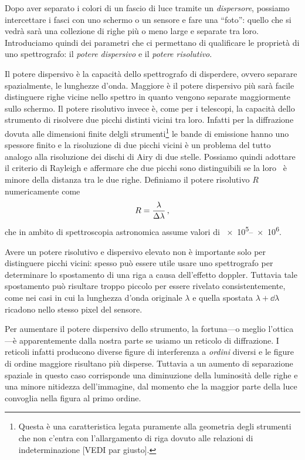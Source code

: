     Dopo aver separato i colori di un fascio di luce tramite un \emph{dispersore}, possiamo intercettare i fasci con uno schermo o un sensore e fare una ``foto'': quello che si vedrà sarà una collezione di righe più o meno large e separate tra loro. Introduciamo quindi dei parametri che ci permettano di qualificare le proprietà di uno spettrografo: il \emph{potere dispersivo} e il \emph{potere risolutivo}.
    
    Il potere dispersivo è la capacità dello spettrografo di disperdere, ovvero separare spazialmente, le lunghezze d'onda. Maggiore è il potere dispersivo più sarà facile distinguere righe vicine nello spettro in quanto vengono separate maggiormente sullo schermo. Il potere risolutivo invece è, come per i telescopi, la capacità dello strumento di risolvere due picchi distinti vicini tra loro. Infatti per la diffrazione dovuta alle dimensioni finite delgli strumenti\footnote{Questa è una caratteristica legata puramente alla geometria degli strumenti che non c'entra con l'allargamento di riga dovuto alle relazioni di indeterminazione [VEDI par giusto].} le bande di emissione hanno uno spessore finito e la risoluzione di due picchi vicini è un problema del tutto analogo alla risoluzione dei dischi di Airy di due stelle. Possiamo quindi adottare il criterio di Rayleigh e affermare che due picchi sono distinguibili se la loro \FWHM\ è minore della distanza tra le due righe. Definiamo il potere risolutivo $R$ numericamente come
    \begin{equation}
        R = \frac{\lambda}{\Delta\lambda}
        \,,
    \end{equation}
    che in ambito di spettroscopia astronomica assume valori di \num{e5}--\num{e6}.

    Avere un potere risolutivo e dispersivo elevato non è importante solo per distinguere picchi vicini: spesso può essere utile usare uno spettrografo per determinare lo spostamento di una riga a causa dell'effetto doppler. Tuttavia tale spostamento può risultare troppo piccolo per essere rivelato consistentemente, come nei casi in cui la lunghezza d'onda originale $\lambda$ e quella spostata $\lambda + \dd{\lambda}$ ricadono nello stesso pixel del sensore.

    Per aumentare il potere dispersivo dello strumento, la fortuna---o meglio l'ottica---è apparentemente dalla nostra parte se usiamo un reticolo di diffrazione. I reticoli infatti producono diverse figure di interferenza a \emph{ordini} diversi e le figure di ordine maggiore risultano più disperse. Tuttavia a un aumento di separazione spaziale in questo caso corrisponde una diminuzione della luminosità delle righe e una minore nitidezza dell'immagine, dal momento che la maggior parte della luce convoglia nella figura al primo ordine.
    
